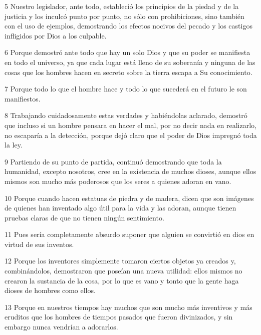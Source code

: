 \par 5 Nuestro legislador, ante todo, estableció los principios de la piedad y de la justicia y los inculcó punto por punto, no sólo con prohibiciones, sino también con el uso de ejemplos, demostrando los efectos nocivos del pecado y los castigos infligidos por Dios a los culpable.

\par 6 Porque demostró ante todo que hay un solo Dios y que su poder se manifiesta en todo el universo, ya que cada lugar está lleno de su soberanía y ninguna de las cosas que los hombres hacen en secreto sobre la tierra escapa a Su conocimiento.

\par 7 Porque todo lo que el hombre hace y todo lo que sucederá en el futuro le son manifiestos.

\par 8 Trabajando cuidadosamente estas verdades y habiéndolas aclarado, demostró que incluso si un hombre pensara en hacer el mal, por no decir nada en realizarlo, no escaparía a la detección, porque dejó claro que el poder de Dios impregnó toda la ley.

\par 9 Partiendo de su punto de partida, continuó demostrando que toda la humanidad, excepto nosotros, cree en la existencia de muchos dioses, aunque ellos mismos son mucho más poderosos que los seres a quienes adoran en vano.

\par 10 Porque cuando hacen estatuas de piedra y de madera, dicen que son imágenes de quienes han inventado algo útil para la vida y las adoran, aunque tienen pruebas claras de que no tienen ningún sentimiento.

\par 11 Pues sería completamente absurdo suponer que alguien se convirtió en dios en virtud de sus inventos.

\par 12 Porque los inventores simplemente tomaron ciertos objetos ya creados y, combinándolos, demostraron que poseían una nueva utilidad: ellos mismos no crearon la sustancia de la cosa, por lo que es vano y tonto que la gente haga dioses de hombres como ellos.

\par 13 Porque en nuestros tiempos hay muchos que son mucho más inventivos y más eruditos que los hombres de tiempos pasados ​​que fueron divinizados, y sin embargo nunca vendrían a adorarlos.

